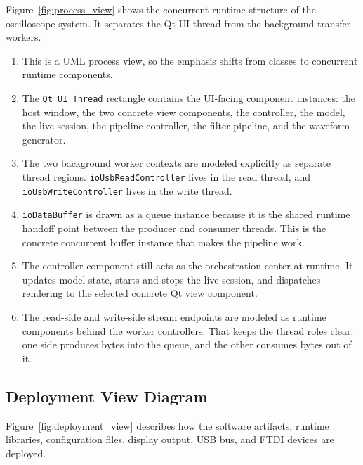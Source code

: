 Figure~\ref{fig:process_view} shows the concurrent runtime structure of the oscilloscope system. It separates the Qt UI thread from the background transfer workers.

\begin{enumerate}
    \item This is a UML process view, so the emphasis shifts from classes to concurrent runtime components.
    \item The \texttt{Qt UI Thread} rectangle contains the UI-facing component instances: the host window, the two concrete view components, the controller, the model, the live session, the pipeline controller, the filter pipeline, and the waveform generator.
    \item The two background worker contexts are modeled explicitly as separate thread regions. \texttt{ioUsbReadController} lives in the read thread, and \texttt{ioUsbWriteController} lives in the write thread.
    \item \texttt{ioDataBuffer} is drawn as a queue instance because it is the shared runtime handoff point between the producer and consumer threads. This is the concrete concurrent buffer instance that makes the pipeline work.
    \item The controller component still acts as the orchestration center at runtime. It updates model state, starts and stops the live session, and dispatches rendering to the selected concrete Qt view component.
    \item The read-side and write-side stream endpoints are modeled as runtime components behind the worker controllers. That keeps the thread roles clear: one side produces bytes into the queue, and the other consumes bytes out of it.
\end{enumerate}

\subsection{Deployment View Diagram}
\label{Section::Deployment View Diagram}


Figure~\ref{fig:deployment_view} describes how the software artifacts, runtime libraries, configuration files, display output, USB bus, and FTDI devices are deployed.

